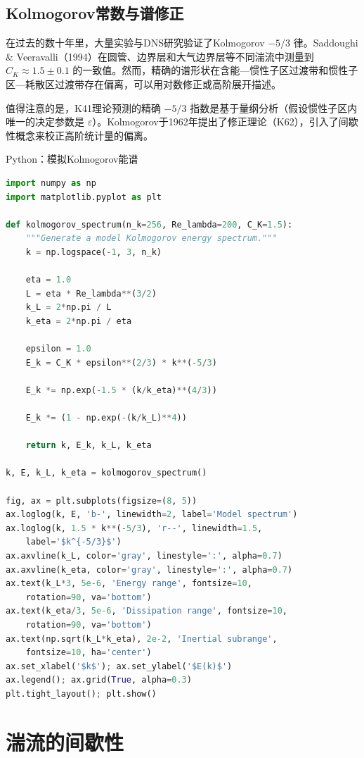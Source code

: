 \subsection{Kolmogorov常数与谱修正}

在过去的数十年里，大量实验与DNS研究验证了Kolmogorov $-5/3$ 律。Saddoughi \& Veeravalli（1994）在圆管、边界层和大气边界层等不同湍流中测量到 $C_K \approx 1.5\pm 0.1$ 的一致值。然而，精确的谱形状在含能—惯性子区过渡带和惯性子区—耗散区过渡带存在偏离，可以用对数修正或高阶展开描述。

值得注意的是，K41理论预测的精确 $-5/3$ 指数是基于量纲分析（假设惯性子区内唯一的决定参数是 $\varepsilon$）。Kolmogorov于1962年提出了修正理论（K62），引入了间歇性概念来校正高阶统计量的偏离。

\begin{mycode}{Python：模拟Kolmogorov能谱}
\begin{lstlisting}[language=Python]
import numpy as np
import matplotlib.pyplot as plt

def kolmogorov_spectrum(n_k=256, Re_lambda=200, C_K=1.5):
    """Generate a model Kolmogorov energy spectrum."""
    k = np.logspace(-1, 3, n_k)
    
    eta = 1.0
    L = eta * Re_lambda**(3/2)
    k_L = 2*np.pi / L
    k_eta = 2*np.pi / eta
    
    epsilon = 1.0
    E_k = C_K * epsilon**(2/3) * k**(-5/3)
    
    E_k *= np.exp(-1.5 * (k/k_eta)**(4/3))
    
    E_k *= (1 - np.exp(-(k/k_L)**4))
    
    return k, E_k, k_L, k_eta

k, E, k_L, k_eta = kolmogorov_spectrum()

fig, ax = plt.subplots(figsize=(8, 5))
ax.loglog(k, E, 'b-', linewidth=2, label='Model spectrum')
ax.loglog(k, 1.5 * k**(-5/3), 'r--', linewidth=1.5,
    label='$k^{-5/3}$')
ax.axvline(k_L, color='gray', linestyle=':', alpha=0.7)
ax.axvline(k_eta, color='gray', linestyle=':', alpha=0.7)
ax.text(k_L*3, 5e-6, 'Energy range', fontsize=10,
    rotation=90, va='bottom')
ax.text(k_eta/3, 5e-6, 'Dissipation range', fontsize=10,
    rotation=90, va='bottom')
ax.text(np.sqrt(k_L*k_eta), 2e-2, 'Inertial subrange',
    fontsize=10, ha='center')
ax.set_xlabel('$k$'); ax.set_ylabel('$E(k)$')
ax.legend(); ax.grid(True, alpha=0.3)
plt.tight_layout(); plt.show()
\end{lstlisting}
\end{mycode}

\section{湍流的间歇性}


